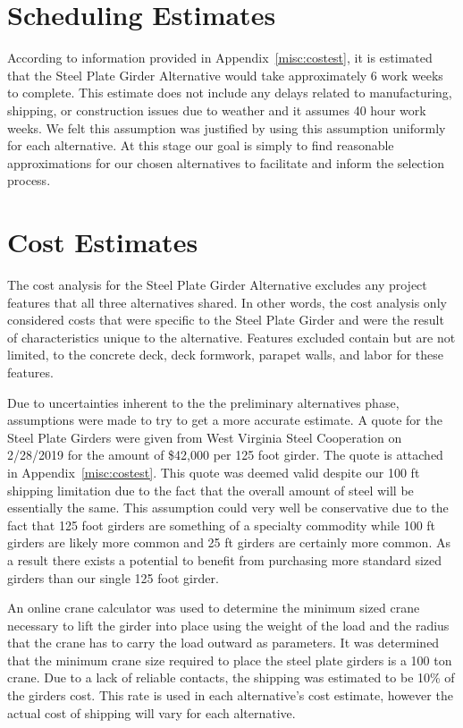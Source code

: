 \section{Scheduling Estimates}
According to information provided in Appendix~\ref{misc:costest}, it is estimated that the Steel Plate Girder Alternative would take approximately 6 work weeks to complete. This estimate does not include any delays related to manufacturing, shipping, or construction issues due to weather and it assumes 40 hour work weeks. We felt this assumption was justified by using this assumption uniformly for each alternative.  At this stage our goal is simply to find reasonable approximations for our chosen alternatives to facilitate and inform the selection process.


\section{Cost Estimates}\label{sec:2.6}
The cost analysis for the Steel Plate Girder Alternative excludes any project features that all three alternatives shared. In other words, the cost analysis only considered costs that were specific to the Steel Plate Girder and were the result of characteristics unique to the alternative. Features excluded contain but are not limited, to the concrete deck, deck formwork, parapet walls, and labor for these features.

Due to uncertainties inherent to the the preliminary alternatives phase, assumptions were made to try to get a more accurate estimate. A quote for the Steel Plate Girders were given from West Virginia Steel Cooperation on 2/28/2019 for the amount of \$42,000 per 125 foot girder. The quote is attached in Appendix~\ref{misc:costest}. This quote was deemed valid despite our 100 ft shipping limitation due to the fact that the overall amount of steel will be essentially the same.  This assumption could very well be conservative due to the fact that 125 foot girders are something of a specialty commodity while 100 ft girders are likely more common and 25 ft girders are certainly more common. As a result there exists a potential to benefit from purchasing more standard sized girders than our single 125 foot girder.

 An online crane calculator was used to determine the minimum sized crane necessary to lift the girder into place using the weight of the load and the radius that the crane has to carry the load outward as parameters. It was determined that the minimum crane size required to place the steel plate girders is a 100 ton crane. Due to a lack of reliable contacts, the shipping was estimated to be 10\% of the girders cost. This rate is used in each alternative's cost estimate, however the actual cost of shipping will vary for each alternative.

